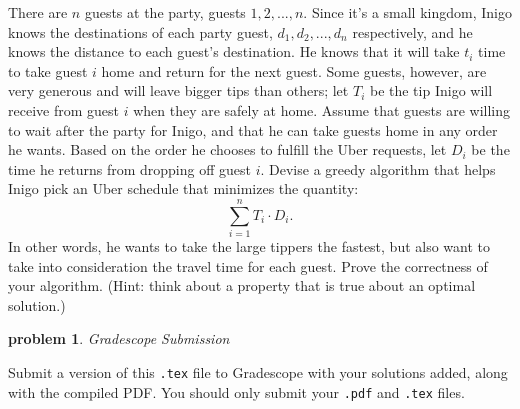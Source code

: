 \documentclass[10pt]{article}
\newtheorem{problem}{\sc\color{cit}problem}
\begin{document}
There are $n$ guests at the party, guests $1, 2, ..., n$.  Since it's a small kingdom, Inigo knows the destinations of each party guest, $d_1, d_2, ..., d_n$ respectively, and he knows the distance to each guest's destination.  He knows that it will take $t_i$ time to take guest $i$ home and return for the next guest.  Some guests, however, are very generous and will leave bigger tips than others; let $T_i$ be the tip Inigo will receive from guest $i$ when they are safely at home.  Assume that guests are willing to wait after the party for Inigo, and that he can take guests home in any order he wants.  Based on the order he chooses to fulfill the Uber requests, let $D_i$ be the time he returns from dropping off guest $i$.  Devise a greedy algorithm that helps Inigo pick an Uber schedule that minimizes the quantity:
\[ \sum_{i=1}^{n} T_i \cdot D_i.\]
In other words, he wants to take the large tippers the fastest, but also want to take into consideration the travel time for each guest.  Prove the correctness of your algorithm.  (Hint: think about a property that is true about an optimal solution.)


\begin{problem} Gradescope Submission \end{problem}
Submit a version of this \verb|.tex| file to Gradescope with your solutions added, along with the compiled PDF.  You should only submit your \verb|.pdf| and \verb|.tex| files.
\end{document}
